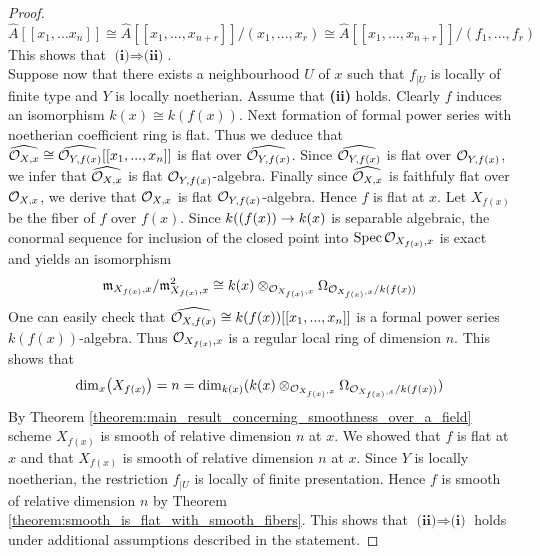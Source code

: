 \begin{proof}
$$\widehat{A}[[x_{1},...x_{n}]]\cong \widehat{A}[[x_1,...,x_{n+r}]]/(x_1,...,x_r)\cong \widehat{A}[[x_1,...,x_{n+r}]]/(f_1,...,f_r)$$
This shows that $\textbf{(i)}\Rightarrow \textbf{(ii)}$.\\
Suppose now that there exists a neighbourhood $U$ of $x$ such that $f_{\mid U}$ is locally of finite type and $Y$ is locally noetherian. Assume that \textbf{(ii)} holds. Clearly $f$ induces an isomorphism $k(x)\cong k(f(x))$. Next formation of formal power series with noetherian coefficient ring is flat. Thus we deduce that $\widehat{{\mathcal O}_{X,x}}\cong \widehat{{\mathcal O}_{Y,f(x)}}[[x_1,...,x_n]]$ is flat over $\widehat{{\mathcal O}_{Y,f(x)}}$. Since $\widehat{{\mathcal O}_{Y,f(x)}}$ is flat over ${\mathcal O}_{Y,f(x)}$, we infer that $\widehat{{\mathcal O}_{X,x}}$ is flat ${\mathcal O}_{Y,f(x)}$-algebra. Finally since $\widehat{{\mathcal O}_{X,x}}$ is faithfuly flat over ${\mathcal O}_{X,x}$, we derive that ${\mathcal O}_{X,x}$ is flat ${\mathcal O}_{Y,f(x)}$-algebra. Hence $f$ is flat at $x$. Let $X_{f(x)}$ be the fiber of $f$ over $f(x)$. Since $k((f(x))\rightarrow k(x)$ is separable algebraic, the conormal sequence for inclusion of the closed point into $\mathrm{Spec}\, {\mathcal O}_{X_{f(x)},x}$ is exact and yields an isomorphism
$$\mathfrak{m}_{X_{f(x)},x}/\mathfrak{m}_{X_{f(x)},x}^2\cong k(x)\otimes_{{\mathcal O}_{X_{f(x)},x}}\Omega_{{\mathcal O}_{X_{f(x)},x}/k(f(x))}$$
One can easily check that $\widehat{{\mathcal O}_{X,f(x)}}\cong k(f(x))[[x_1,...,x_n]]$ is a formal power series $k(f(x))$-algebra. Thus ${\mathcal O}_{X_{f(x)},x}$ is a regular local ring of dimension $n$. This shows that
$$\mathrm{dim}_x\big(X_{f(x)}\big)=n=\mathrm{dim}_{k(x)}(k(x)\otimes_{{\mathcal O}_{X_{f(x)},x}}\Omega_{{\mathcal O}_{X_{f(x)},x}/k(f(x))})$$
By Theorem \ref{theorem:main_result_concerning_smoothness_over_a_field}  scheme $X_{f(x)}$ is smooth of relative dimension $n$ at $x$. We showed that $f$ is flat at $x$ and that $X_{f(x)}$ is smooth of relative dimension $n$ at $x$. Since $Y$ is locally noetherian, the restriction $f_{\mid U}$ is locally of finite presentation. Hence $f$ is smooth of relative dimension $n$ by Theorem \ref{theorem:smooth_is_flat_with_smooth_fibers}. This shows that $\textbf{(ii)}\Rightarrow \textbf{(i)}$ holds under additional assumptions described in the statement.
\end{proof}


\small



